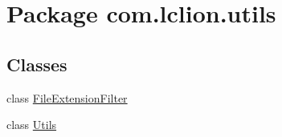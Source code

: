 \hypertarget{namespacecom_1_1lclion_1_1utils}{\section{Package com.\+lclion.\+utils}
\label{namespacecom_1_1lclion_1_1utils}
}
\subsection*{Classes}
\begin{DoxyCompactItemize}
\item 
class \hyperlink{classcom_1_1lclion_1_1utils_1_1_file_extension_filter}{File\+Extension\+Filter}
\item 
class \hyperlink{classcom_1_1lclion_1_1utils_1_1_utils}{Utils}
\end{DoxyCompactItemize}
